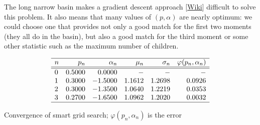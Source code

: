 \documentclass[oneside,10pt]{book}
\begin{document}
The long narrow basin makes a 
\textcolor{index}{gradient descent} approach [\href{https://en.wikipedia.org/wiki/Gradient_descent}{Wiki}]    
  difficult
 to solve this problem. It also means that many values of $(p,\alpha)$ are nearly optimum: we could choose one 
 that provides not only a good match for the first two moments (they all do in the basin), but also a good match for the third moment or some other 
 statistic such as the maximum number of children. 

\begin{table}[H]
\[
\begin{array}{lrrrrr}
\hline
n	& p_n& \alpha_n	& \mu_n&	\sigma_n & \varphi(p_n,\alpha_n)\\
\hline
\hline
0 & 0.5000 & 0.0000 & -  & - & - \\
 1 & 0.3000 & -1.5000 &  1.1612 &  1.2698 & 0.0926\\
2 & 0.3000 & -1.3500 &   1.0640 & 1.2219 & 0.0353\\
3  & 0.2700 & -1. 6500 &  1.0962 & 1.2020 & 0.0032\\
\hline
\end{array}
\]
\caption{\label{tablerone} Convergence of smart grid search; $\varphi(p_n,\alpha_n)$ is the error}
\end{table}
\end{document}

